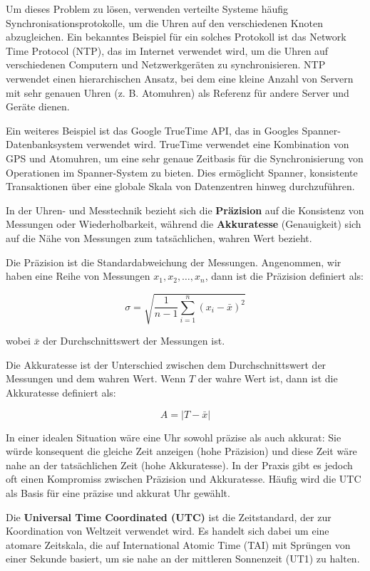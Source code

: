 Um dieses Problem zu lösen, verwenden verteilte Systeme häufig Synchronisationsprotokolle, um die Uhren auf den verschiedenen Knoten abzugleichen. Ein bekanntes Beispiel für ein solches Protokoll ist das Network Time Protocol (NTP), das im Internet verwendet wird, um die Uhren auf verschiedenen Computern und Netzwerkgeräten zu synchronisieren. NTP verwendet einen hierarchischen Ansatz, bei dem eine kleine Anzahl von Servern mit sehr genauen Uhren (z. B. Atomuhren) als Referenz für andere Server und Geräte dienen.

Ein weiteres Beispiel ist das Google TrueTime API, das in Googles Spanner-Datenbanksystem verwendet wird. TrueTime verwendet eine Kombination von GPS und Atomuhren, um eine sehr genaue Zeitbasis für die Synchronisierung von Operationen im Spanner-System zu bieten. Dies ermöglicht Spanner, konsistente Transaktionen über eine globale Skala von Datenzentren hinweg durchzuführen.


In der Uhren- und Messtechnik bezieht sich die \textbf{Präzision} auf die Konsistenz von Messungen oder Wiederholbarkeit, während die \textbf{Akkuratesse} (Genauigkeit) sich auf die Nähe von Messungen zum tatsächlichen, wahren Wert bezieht.

Die Präzision ist die Standardabweichung der Messungen. Angenommen, wir haben eine Reihe von Messungen $x_1, x_2, \ldots, x_n$, dann ist die Präzision definiert als:

\begin{equation}
\sigma = \sqrt{\frac{1}{n-1} \sum_{i=1}^{n} (x_i - \bar{x})^2}
\end{equation}

wobei $\bar{x}$ der Durchschnittswert der Messungen ist.

Die Akkuratesse ist der Unterschied zwischen dem Durchschnittswert der Messungen und dem wahren Wert. Wenn $T$ der wahre Wert ist, dann ist die Akkuratesse definiert als:

\begin{equation}
A = |T - \bar{x}|
\end{equation}

In einer idealen Situation wäre eine Uhr sowohl präzise als auch akkurat: Sie würde konsequent die gleiche Zeit anzeigen (hohe Präzision) und diese Zeit wäre nahe an der tatsächlichen Zeit (hohe Akkuratesse). In der Praxis gibt es jedoch oft einen Kompromiss zwischen Präzision und Akkuratesse.
Häufig wird die UTC als Basis für eine präzise und akkurat Uhr gewählt.

Die \textbf{Universal Time Coordinated (UTC)} ist die Zeitstandard, der zur Koordination von Weltzeit verwendet wird. Es handelt sich dabei um eine atomare Zeitskala, die auf International Atomic Time (TAI) mit Sprüngen von einer Sekunde basiert, um sie nahe an der mittleren Sonnenzeit (UT1) zu halten.

